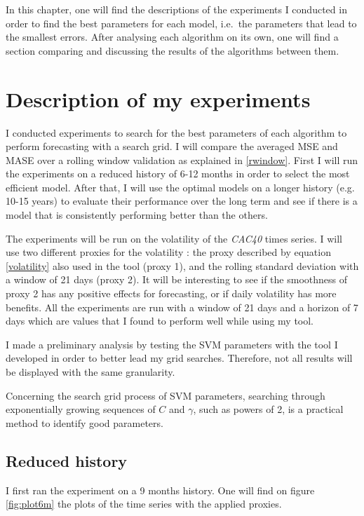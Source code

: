 \documentclass[11pt,a4paper,oneside]{book}
\begin{document}
In this chapter, one will find the descriptions of the experiments I conducted in order to find the best parameters for each model, i.e.\ the parameters that lead to the smallest errors. After analysing each algorithm on its own, one will find a section comparing and discussing the results of the algorithms between them.


\section{Description of my experiments}

I conducted experiments to search for the best parameters of each algorithm to perform forecasting with a search grid. I will compare the averaged MSE and MASE over a rolling window validation as explained in \ref{rwindow}. First I will run the experiments on a reduced history of 6-12 months in order to select the most efficient model. After that, I will use the optimal models on a longer history (e.g. 10-15 years) to evaluate their performance over the long term and see if there is a model that is consistently performing better than the others. 

The experiments will be run on the volatility of the \textit{CAC40} times series. I will use two different proxies for the volatility : the proxy described by equation \ref{volatility} also used in the tool (proxy 1), and the rolling standard deviation with a window of 21 days (proxy 2). It will be interesting to see if the smoothness of proxy 2 has any positive effects for forecasting, or if daily volatility has more benefits. All the experiments are run with a window of 21 days and a horizon of 7 days which are values that I found to perform well while using my tool.

I made a preliminary analysis by testing the SVM parameters with the tool I developed in order to better lead my grid searches. Therefore, not all results will be displayed with the same granularity.

Concerning the search grid process of SVM parameters, searching through exponentially growing sequences of $C$ and $\gamma$, such as powers of 2, is a practical method to identify good parameters. \cite{Hsu}


\subsection{Reduced history}

I first ran the experiment on a 9 months history. One will find on figure \ref{fig:plot6m} the plots of the time series with the applied proxies.
\end{document}
